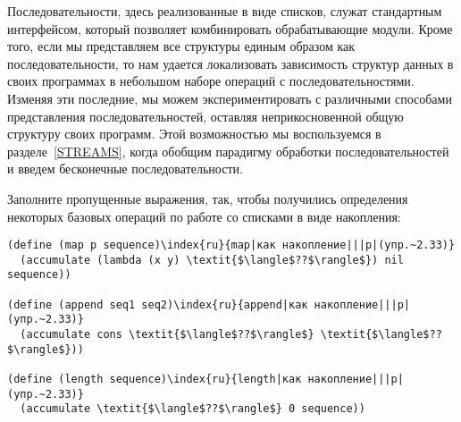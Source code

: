 Последовательности, здесь реализованные в виде
списков, служат стандартным интерфейсом, который позволяет
комбинировать обрабатывающие модули.  Кроме того, если мы
представляем все структуры единым образом как последовательности, то
нам удается локализовать зависимость структур данных в своих
программах в небольшом наборе операций с последовательностями.
Изменяя эти последние, мы можем экспериментировать с различными
способами представления последовательностей, оставляя неприкосновенной 
общую структуру своих программ.  Этой возможностью мы воспользуемся в
разделе~\ref{STREAMS}, когда обобщим парадигму обработки 
последовательностей и введем бесконечные последовательности.
\begin{exercise}{2.33}\label{EX2.33}%
Заполните пропущенные выражения, так, чтобы получились
определения некоторых базовых операций по работе со списками в виде
накопления:

\begin{Verbatim}[fontsize=\small]
(define (map p sequence)\index{ru}{map|как накопление|||p|(упр.~2.33)}
  (accumulate (lambda (x y) \textit{$\langle$??$\rangle$}) nil sequence))

(define (append seq1 seq2)\index{ru}{append|как накопление|||p|(упр.~2.33)}
  (accumulate cons \textit{$\langle$??$\rangle$} \textit{$\langle$??$\rangle$}))

(define (length sequence)\index{ru}{length|как накопление|||p|(упр.~2.33)}
  (accumulate \textit{$\langle$??$\rangle$} 0 sequence))
\end{Verbatim}
\end{exercise}
